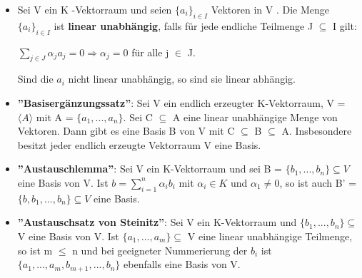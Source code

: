 \begin{itemize}
\begin{remark}
\begin{enumerate}
\end{enumerate} 
\end{remark}
\item Sei V ein K -Vektorraum und seien $\{a_i \}_{i \in I}$ Vektoren in V . Die Menge $\{a_i\}_{i \in I}$ ist \textbf{linear unabhängig}, falls für jede endliche Teilmenge J $\subseteq$ I gilt:
\begin{center}
$\sum\nolimits_{j \in J} \alpha_j a_j = 0 \Rightarrow \alpha_j = 0$ für alle j $\in$ J.
\end{center}
Sind die $a_i$ nicht linear unabhängig, so sind sie linear abhängig.
\item \textbf{”Basisergänzungssatz”}: Sei V ein endlich erzeugter K-Vektorraum, V = $\langle A \rangle$ mit A = $\{a_1,... ,a_n\}$. Sei C $\subseteq$ A eine linear unabhängige Menge von Vektoren. Dann gibt es eine Basis B von V mit C $\subseteq$ B $\subseteq$ A. Insbesondere besitzt jeder endlich erzeugte Vektorraum V eine Basis.
\item \textbf{”Austauschlemma”}: Sei V ein K-Vektorraum und sei B = $\{b_1,... ,b_n\} \subseteq V$ eine Basis von V. Ist $b= \sum\nolimits_{i=1}^{n} \alpha_i b_i$ mit $\alpha_i \in K$ und $\alpha_1 \neq 0$, so ist auch B' = $\{ b, b_1, …, b_n \} \subseteq V$ eine Basis.
\item \textbf{”Austauschsatz von Steinitz”}: Sei V ein K-Vektorraum und $\{b_1,... ,b_n\} \subseteq$ V eine Basis von V. Ist $\{a_1,... ,a_m\} \subseteq$ V eine linear unabhängige Teilmenge, so ist m $\le$ n und bei geeigneter Nummerierung der $b_i$ ist $\{a_1,... ,a_m, b_{m+1},... ,b_n\}$ ebenfalls eine Basis von V.
\end{itemize}

